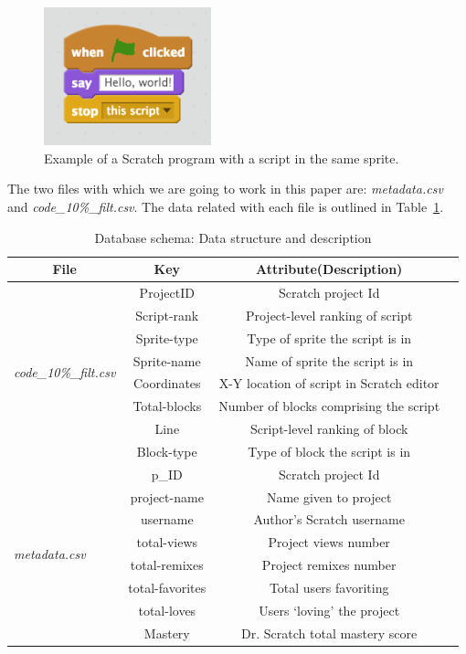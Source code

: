 \documentclass[a4paper,twocolumn,10pt]{article}
\begin{document}
\begin{figure}
\begin{center}
\includegraphics[height=4cm]{images/scratch.png}
\caption{Example of a Scratch program with a script in the same sprite.}
\label{tab:scratch}
\end{center}
\end{figure}

The two files with which we are going to work in this paper are:
\textit{metadata.csv} and \textit{code\_10\%\_filt.csv}. 
The data related with each file is outlined in Table~\ref{tab:schema}.

\begin{table}
  \centering\renewcommand{\arraystretch}{1.2}
   \begin{tabular}{@{}lccc@{}}
    \toprule
    \multicolumn{1}{c}{\textbf{File}} & \textbf{Key} &\textbf{Attribute(Description)} \\
    \midrule
    \multirow{8}{*}{\textit{code\_10\%\_filt.csv}} & ProjectID & Scratch project Id \\
                & Script-rank & Project-level ranking of script \\
                & Sprite-type & Type of sprite the script is in\\
                & Sprite-name & Name of sprite the script is in\\
                & Coordinates & X-Y location of script in Scratch editor\\
                & Total-blocks & Number of blocks comprising the script \\
                & Line & Script-level ranking of block \\
                & Block-type & Type of block the script is in\\
    \hline
    \multirow{8}{*}{\textit{metadata.csv}} & p\_ID & Scratch project Id \\
                & project-name & Name given to project \\
                & username & Author’s Scratch username\\
                & total-views & Project views number \\
                & total-remixes & Project remixes number \\
                & total-favorites & Total users favoriting \\
                & total-loves & Users ‘loving’ the project \\
                & Mastery & Dr. Scratch total mastery score\\
    \bottomrule
    \end{tabular}
    \caption{Database schema: Data structure and description}
    \label{tab:schema}
\end{table}
\end{document}

